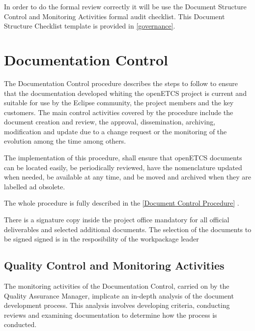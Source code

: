 \documentclass{template/openetcs_article}
\begin{document}
In order to do the formal review correctly it will be use the Document  Structure Control and Monitoring Activities formal audit checklist. This Document Structure Checklist template is provided in \href{https://github.com/openETCS/governance/tree/master/Templates}{[governance]}.

\section{Documentation Control}
The Documentation Control procedure describes the steps to follow to ensure that the documentation developed whiting the openETCS project is current and suitable for use by the Eclipse community, the project members and the key customers. The main control activities covered by the procedure include the document creation and review, the approval, dissemination, archiving, modification and update due to a change request or the monitoring of the evolution among the time among others.

The implementation of this procedure, shall ensure that openETCS documents can be located easily, be periodically reviewed, have the nomenclature updated when needed, be available at any time, and be moved and archived when they are labelled ad obsolete.

The whole procedure is fully described in the \href{https://github.com/openETCS/governance/tree/master/Document%20Control%20Process}{[Document Control Procedure]} .

There is a signature copy inside the project office mandatory for all official deliverables and selected additional documents. The selection of the documents to be signed signed is in the resposibility of the workpackage leader

\subsection{Quality Control and Monitoring Activities}
The monitoring activities of the Documentation Control, carried on by the Quality Assurance Manager, implicate an in-depth analysis of the document development process. This analysis involves developing criteria, conducting reviews and examining documentation to determine how the process is conducted.
\end{document}
